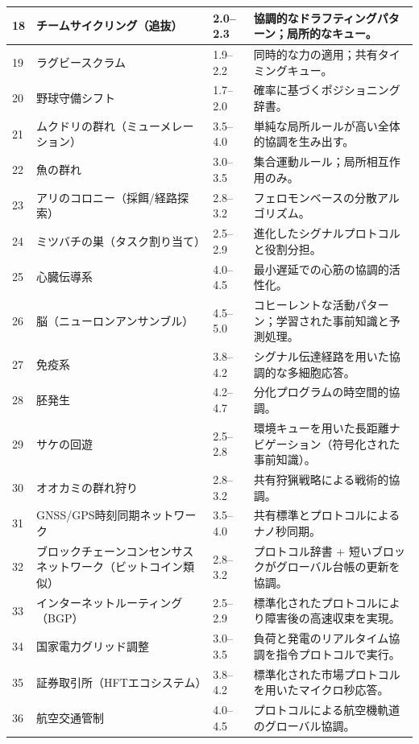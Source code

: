 \documentclass[13pt,a4paper]{ltjsarticle}
\begin{document}
\begin{longtable}{|p{0.8cm}|p{6.2cm}|p{3.0cm}|p{5.7cm}|}
	\hline
	18 & チームサイクリング（追抜） & 2.0--2.3 & 協調的なドラフティングパターン；局所的なキュー。 \\
	\hline
	19 & ラグビースクラム & 1.9--2.2 & 同時的な力の適用；共有タイミングキュー。 \\
	\hline
	20 & 野球守備シフト & 1.7--2.0 & 確率に基づくポジショニング辞書。 \\
	\hline
	21 & ムクドリの群れ（ミューメレーション） & 3.5--4.0 & 単純な局所ルールが高い全体的協調を生み出す。 \\
	\hline
	22 & 魚の群れ & 3.0--3.5 & 集合運動ルール；局所相互作用のみ。 \\
	\hline
	23 & アリのコロニー（採餌/経路探索） & 2.8--3.2 & フェロモンベースの分散アルゴリズム。 \\
	\hline
	24 & ミツバチの巣（タスク割り当て） & 2.5--2.9 & 進化したシグナルプロトコルと役割分担。 \\
	\hline
	25 & 心臓伝導系 & 4.0--4.5 & 最小遅延での心筋の協調的活性化。 \\
	\hline
	26 & 脳（ニューロンアンサンブル） & 4.5--5.0 & コヒーレントな活動パターン；学習された事前知識と予測処理。 \\
	\hline
	27 & 免疫系 & 3.8--4.2 & シグナル伝達経路を用いた協調的な多細胞応答。 \\
	\hline
	28 & 胚発生 & 4.2--4.7 & 分化プログラムの時空間的協調。 \\
	\hline
	29 & サケの回遊 & 2.5--2.8 & 環境キューを用いた長距離ナビゲーション（符号化された事前知識）。 \\
	\hline
	30 & オオカミの群れ狩り & 2.8--3.2 & 共有狩猟戦略による戦術的協調。 \\
	\hline
	31 & GNSS/GPS時刻同期ネットワーク & 3.5--4.0 & 共有標準とプロトコルによるナノ秒同期。 \\
	\hline
	32 & ブロックチェーンコンセンサスネットワーク（ビットコイン類似） & 2.8--3.2 & プロトコル辞書 + 短いブロックがグローバル台帳の更新を協調。 \\
	\hline
	33 & インターネットルーティング（BGP） & 2.5--2.9 & 標準化されたプロトコルにより障害後の高速収束を実現。 \\
	\hline
	34 & 国家電力グリッド調整 & 3.0--3.5 & 負荷と発電のリアルタイム協調を指令プロトコルで実行。 \\
	\hline
	35 & 証券取引所（HFTエコシステム） & 3.8--4.2 & 標準化された市場プロトコルを用いたマイクロ秒応答。 \\
	\hline
	36 & 航空交通管制 & 4.0--4.5 & プロトコルによる航空機軌道のグローバル協調。 \\

\end{longtable}
\end{document}
